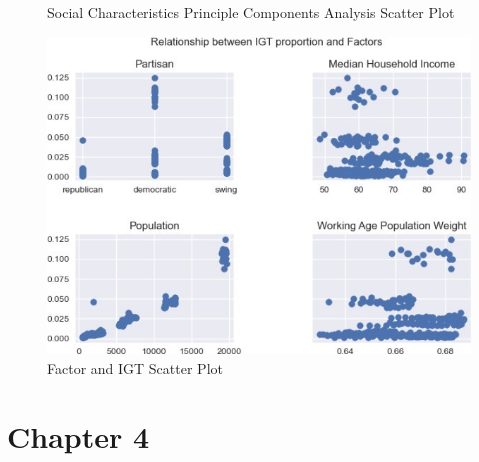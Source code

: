 \begin{figure}[H]
    \centering  %
    \caption[Principle Components Analysis Scatter Plot]{Social Characteristics Principle Components Analysis Scatter Plot}    %
    \label{Figure 2.2}    %
\end{figure}
\clearpage
\begin{figure}[H]
    \centering
    \includegraphics[scale=1]{Chapter-3/Figures/IGT and factors.jpg}
    \caption[IGT and Factors Scatter Plot]{Factor and IGT Scatter Plot
        \texttt{} }
    \label{Figure 2.3}
\end{figure}

\clearpage

\section{Chapter 4}

